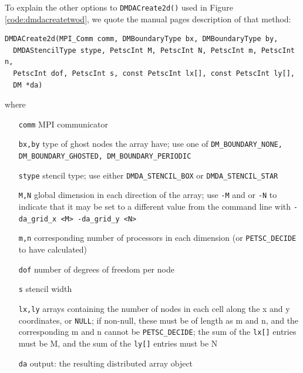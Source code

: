 To explain the other options to \texttt{DMDACreate2d()} used in Figure \ref{code:dmdacreatetwod}, we quote the \PETSc manual pages description of that method:

\clearpage
\noindent\hrulefill
\begin{Verbatim}[fontsize=\small]
DMDACreate2d(MPI_Comm comm, DMBoundaryType bx, DMBoundaryType by,
  DMDAStencilType stype, PetscInt M, PetscInt N, PetscInt m, PetscInt n,
  PetscInt dof, PetscInt s, const PetscInt lx[], const PetscInt ly[],
  DM *da)
\end{Verbatim}
where
\small
\begin{itemize}[align=left]
\item[\texttt{comm}]   MPI communicator \\
\item[\texttt{bx,by}]  type of ghost nodes the array have; use one of \texttt{DM\_BOUNDARY\_NONE, DM\_BOUNDARY\_GHOSTED, DM\_BOUNDARY\_PERIODIC} \\
\item[\texttt{stype}] stencil type; use either \texttt{DMDA\_STENCIL\_BOX} or \texttt{DMDA\_STENCIL\_STAR} \\
\item[\texttt{M,N}]	   global dimension in each direction of the array; use \texttt{-M} and or \texttt{-N} to indicate that it may be set to a different value from the command line with \texttt{-da\_grid\_x <M> -da\_grid\_y <N>} \\
\item[\texttt{m,n}]   corresponding number of processors in each dimension (or \texttt{PETSC\_DECIDE} to have calculated) \\
\item[\texttt{dof}]     number of degrees of freedom per node \\
\item[\texttt{s}]       stencil width \\
\item[\texttt{lx,ly}]  arrays containing the number of nodes in each cell along the x and y coordinates, or \texttt{NULL}; if non-null, these must be of length as m and n, and the corresponding m and n cannot be \texttt{PETSC\_DECIDE}; the sum of the \texttt{lx[]} entries must be M, and the sum of the \texttt{ly[]} entries must be N \\
\item[\texttt{da}]      output: the resulting distributed array object 
\end{itemize}
\normalsize
\noindent\hrulefill
\medskip

